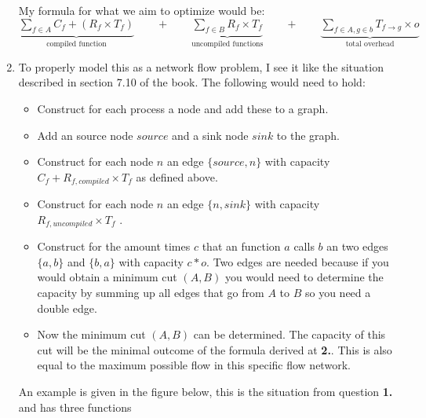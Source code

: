 \documentclass[11pt,twoside,a4paper]{article}
\begin{document}
\begin{enumerate}
My formula for what we aim to optimize would be: \\
$ \underbrace{\sum\limits_{f \in A} C_f + \left( R_f \times T_f \right)}_\text{compiled function}  \qquad + \qquad  \underbrace{\sum\limits_{f \in B} R_f \times T_f}_\text{uncompiled functions} \qquad + \qquad \underbrace{\sum\limits_{f \in A,g \in b} T_{f \rightarrow g} \times o}_\text{total overhead} $
\item To properly model this as a network flow problem, I see it like the situation described in section 7.10 of the book. The following would need to hold:
\begin{itemize}
\item Construct for each process a node and add these to a graph.
\item Add an source node $source$ and a sink node $sink$ to the graph.
\item Construct for each node $n$ an edge $\{source,n\}$ with capacity $C_f + R_{f,compiled} \times T_f$ as defined above.
\item Construct for each node $n$ an edge $\{n,sink\}$ with capacity $R_{f,uncompiled} \times T_f$ .
\item Construct for the amount times $c$ that an function $a$ calls $b$ an two edges $\{a,b\}$ and $\{b,a\}$ with capacity $c*o$. Two edges are needed because if you would obtain a minimum cut $(A,B)$ you would need to determine the capacity by summing up all edges that go from $A$ to $B$ so you need a double edge.
\item Now the minimum cut $(A,B)$ can be determined. The capacity of this cut will be the minimal outcome of the formula derived at \textbf{2.}. This is also equal to the maximum possible flow in this specific flow network.
\end{itemize}
\newpage
An example is given in the figure below, this is the situation from question \textbf{1.} and has three functions
\begin{figure}[!h]
\centering
{}
\end{figure}
\end{enumerate}
\end{document}
